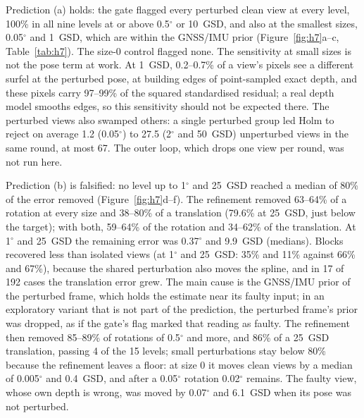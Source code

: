 Prediction (a) holds: the gate flagged every perturbed clean view at every level, 100\% in all nine levels
at or above 0.5$^{\circ}$ or 10~GSD, and also at the smallest sizes, 0.05$^{\circ}$ and 1~GSD, which are within the
GNSS/IMU prior (Figure~\ref{fig:h7}a--c, Table~\ref{tab:h7}). The size-0 control flagged none. The
sensitivity at small sizes is not the pose term at work. At 1~GSD, 0.2--0.7\% of a view's pixels see a
different surfel at the perturbed pose, at building edges of point-sampled exact depth, and these pixels
carry 97--99\% of the squared standardised residual; a real depth model smooths edges, so this sensitivity
should not be expected there. The perturbed views also swamped others: a single perturbed group led Holm to
reject on average 1.2 (0.05$^{\circ}$) to 27.5 (2$^{\circ}$ and 50~GSD) unperturbed views in the same round, at most 67.
The outer loop, which drops one view per round, was not run here.

Prediction (b) is falsified: no level up to 1$^{\circ}$ and 25~GSD reached a median of 80\% of the error
removed (Figure~\ref{fig:h7}d--f). The refinement removed 63--64\% of a rotation at every size and
38--80\% of a translation (79.6\% at 25~GSD, just below the target); with both, 59--64\% of the rotation
and 34--62\% of the translation. At 1$^{\circ}$ and 25~GSD the remaining error was 0.37$^{\circ}$ and 9.9~GSD
(medians). Blocks recovered less than isolated views (at 1$^{\circ}$ and 25~GSD: 35\% and 11\% against 66\%
and 67\%), because the shared perturbation also moves the spline, and in 17 of 192 cases the translation
error grew. The main cause is the GNSS/IMU prior of the perturbed frame, which holds the estimate near its
faulty input; in an exploratory variant that is not part of the prediction, the perturbed frame's prior
was dropped, as if the gate's flag marked that reading as faulty. The refinement then removed 85--89\% of
rotations of 0.5$^{\circ}$ and more, and 86\% of a 25~GSD translation, passing 4 of the 15 levels; small
perturbations stay below 80\% because the refinement leaves a floor: at size 0 it moves clean views by a median
of 0.005$^{\circ}$ and 0.4~GSD, and after a 0.05$^{\circ}$ rotation 0.02$^{\circ}$ remains. The faulty view, whose own
depth is wrong, was moved by 0.07$^{\circ}$ and 6.1~GSD when its pose was not perturbed.

\begin{table}[!t]
\caption{H7 per level: perturbed clean views $n$; share flagged by the gate; median share of the error removed
by the refinement as specified (rotation/translation) and in the exploratory variant without the perturbed
frame's prior; median error after refinement; unperturbed views rejected by Holm in the same round, mean per
perturbed group. a: in the range of prediction (a); b: in the range of prediction (b).}
\label{tab:h7}
\centering\scriptsize\setlength{\tabcolsep}{2.5pt}

\end{table}
\FloatBarrier

